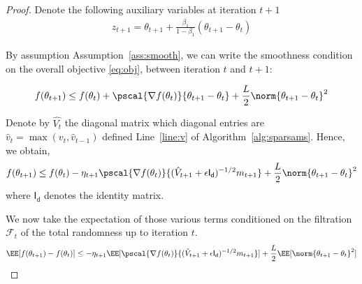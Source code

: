 \documentclass[11pt]{article}
\begin{document}
\begin{proof}


%


Denote the following auxiliary variables at iteration $t+1$
\begin{align}
z_{t+1} = \theta_{t+1} + \frac{\beta_1}{1-\beta_1}(\theta_{t+1} - \theta_{t})
\end{align}

By assumption Assumption~\ref{ass:smooth}, we can write the smoothness condition on the overall objective \eqref{eq:obj}, between iteration $t$ and $t+1$:

\begin{equation}
f(\theta_{t+1}) \leq f(\theta_{t})+  \pscal{\nabla f(\theta_t)}{\theta_{t+1} - \theta_{t}} + \frac{L}{2} \norm{\theta_{t+1} - \theta_{t}}^2
\end{equation}

Denote by $\hat{V_t}$ the diagonal matrix which diagonal entries are $\hat v_t=\max(v_t,\hat v_{t-1})$ defined Line~\ref{line:v} of Algorithm~\ref{alg:sparsams}.
Hence, we obtain,
\begin{equation}
f(\theta_{t+1}) \leq f(\theta_{t}) - \eta_{t+1} \pscal{\nabla f(\theta_t)}{(\hat{V}_{t+1} + \epsilon \mathsf{I_d})^{-1/2} m_{t+1}} + \frac{L}{2} \norm{\theta_{t+1} - \theta_{t}}^2
\end{equation}
where $\mathsf{I_d}$ denotes the identity matrix.

We now take the expectation of those various terms conditioned on the filtration $\mathcal{F}_t$ of the total randomness up to iteration $t$.
\begin{equation}\label{eq:smooth1}
\EE[f(\theta_{t+1}) - f(\theta_{t}) ] \leq - \eta_{t+1} \EE[\pscal{\nabla f(\theta_t)}{(\hat{V}_{t+1} + \epsilon \mathsf{I_d})^{-1/2} m_{t+1}}] + \frac{L}{2} \EE[\norm{\theta_{t+1} - \theta_{t}}^2]
\end{equation}


\end{proof}
\end{document}
